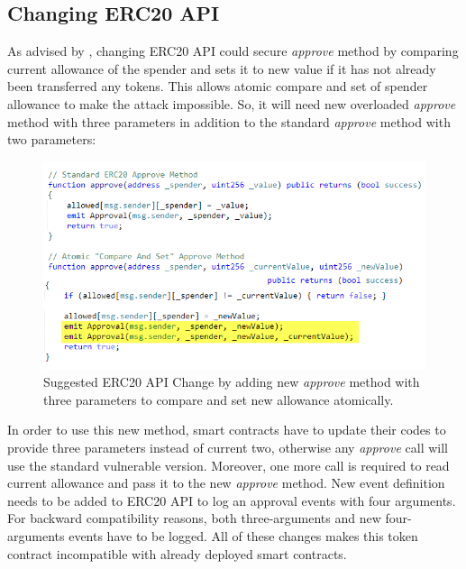 \subsection{Changing ERC20 API}
As advised by \cite{Ref03}, changing ERC20 API could secure \textit{approve} method by comparing current allowance of the spender and sets it to new value if it has not already been transferred any tokens. This allows atomic compare and set of spender allowance to make the attack impossible. So, it will need new overloaded \textit{approve} method with three parameters in addition to the standard \textit{approve} method with two parameters:
\begin{figure}[H]
	\centering
	\includegraphics[width=1.0\linewidth]{figures/multiple_withdrawal_12.png}
	\caption{Suggested ERC20 API Change by adding new \textit{approve} method with three parameters to compare and set new allowance atomically.}
\end{figure}
\noindent In order to use this new method, smart contracts have to update their codes to provide three parameters instead of current two, otherwise any \textit{approve} call will use the standard vulnerable version. Moreover, one more call is required to read current allowance and pass it to the new \textit{approve} method. New event definition needs to be added to ERC20 API to log an approval events with four arguments. For backward compatibility reasons, both three-arguments and new four-arguments events have to be logged. All of these changes makes this token contract incompatible with already deployed smart contracts.

